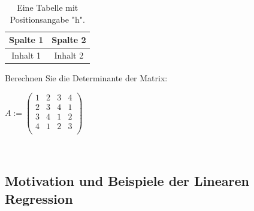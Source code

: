 \documentclass[12pt]{article}
\begin{document}
{\color{red}{******* Beispiel von Latex Syntax für eine Tabelle und ein Matrix  *******}}\\[0.2cm]
{\color{red}{******* rest fehlt noch  *******}}\\[0.2cm]

\begin{table}[h] %
  \centering
  \begin{tabular}{|c|c|}
    \hline
    Spalte 1 & Spalte 2 \\
    \hline
    Inhalt 1 & Inhalt 2 \\
    \hline
  \end{tabular}
  \caption{Eine Tabelle mit Positionsangabe "h".}
  \label{tab:tabelle_h}
\end{table}


Berechnen Sie die Determinante der Matrix:
\\[0.1cm]
\begin{center}
\hspace*{0.1cm}

$ A := \left(
   \begin{array}{llll}
     1 & 2 & 3 & 4 \\
     2 & 3 & 4 & 1 \\ 
     3 & 4 & 1 & 2 \\ 
     4 & 1 & 2 & 3 \\ 
   \end{array}
   \right) $ 
\\[0.3cm]
\end{center} 
{\color{red}{******* Ende Beispiel von Latex Syntax für eine Tabelle und eine Matrix *******}}\\[0.2cm] 
 

\subsection{Motivation und Beispiele der Linearen Regression}
\end{document}
